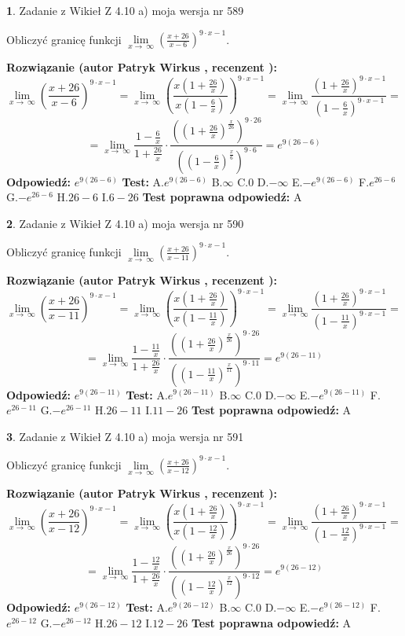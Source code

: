 \documentclass[12pt, a4paper]{article}
\theoremstyle{definition} %
\newtheorem{zad}{}
\newcommand{\zadStart}[1]{\begin{zad}#1\newline}
\newcommand{\zadStop}{\end{zad}}
\newcommand{\rozwStart}[2]{\noindent \textbf{Rozwiązanie (autor #1 , recenzent #2): }\newline}
\newcommand{\rozwStop}{\newline}
\newcommand{\odpStart}{\noindent \textbf{Odpowiedź:}\newline}
\newcommand{\odpStop}{\newline}
\newcommand{\testStart}{\noindent \textbf{Test:}\newline}
\newcommand{\testStop}{\newline}
\newcommand{\kluczStart}{\noindent \textbf{Test poprawna odpowiedź:}\newline}
\newcommand{\kluczStop}{\newline}
\begin{document}
\zadStart{Zadanie z Wikieł Z 4.10 a) moja wersja nr 589}


Obliczyć granicę funkcji  $\lim\limits_{x\to\ \infty}(\frac{x+26}{x-6})^{9\cdot x-1}$.
\zadStop
\rozwStart{Patryk Wirkus}{}
$$\lim\limits_{x\to\ \infty}(\frac{x+26}{x-6})^{9\cdot x-1} = \lim\limits_{x\to\ \infty}(\frac{x(1+\frac{26}{x})}{x(1-\frac{6}{x})})^{9\cdot x-1}=\lim\limits_{x\to\ \infty}\frac{(1+\frac{26}{x})^{9\cdot x-1}}{(1-\frac{6}{x})^{9\cdot x-1}}=$$
$$=\lim\limits_{x\to\ \infty}\frac{1-\frac{6}{x}}{1+\frac{26}{x}}\cdot\frac{((1+\frac{26}{x})^{\frac{x}{26}})^{9\cdot26}}{((1-\frac{6}{x})^{\frac{x}{6}})^{9\cdot6}}=e^{9(26-6)}$$
\rozwStop
\odpStart
$e^{9(26-6)}$
\odpStop
\testStart
A.$e^{9(26-6)}$ B.$\infty$ C.$0$ D.$-\infty$ E.$-e^{9(26-6)}$
F.$e^{26-6}$ G.$-e^{26-6}$
H.$26-6$
I.$6-26$
\testStop
\kluczStart
A
\kluczStop



\zadStart{Zadanie z Wikieł Z 4.10 a) moja wersja nr 590}


Obliczyć granicę funkcji  $\lim\limits_{x\to\ \infty}(\frac{x+26}{x-11})^{9\cdot x-1}$.
\zadStop
\rozwStart{Patryk Wirkus}{}
$$\lim\limits_{x\to\ \infty}(\frac{x+26}{x-11})^{9\cdot x-1} = \lim\limits_{x\to\ \infty}(\frac{x(1+\frac{26}{x})}{x(1-\frac{11}{x})})^{9\cdot x-1}=\lim\limits_{x\to\ \infty}\frac{(1+\frac{26}{x})^{9\cdot x-1}}{(1-\frac{11}{x})^{9\cdot x-1}}=$$
$$=\lim\limits_{x\to\ \infty}\frac{1-\frac{11}{x}}{1+\frac{26}{x}}\cdot\frac{((1+\frac{26}{x})^{\frac{x}{26}})^{9\cdot26}}{((1-\frac{11}{x})^{\frac{x}{11}})^{9\cdot11}}=e^{9(26-11)}$$
\rozwStop
\odpStart
$e^{9(26-11)}$
\odpStop
\testStart
A.$e^{9(26-11)}$ B.$\infty$ C.$0$ D.$-\infty$ E.$-e^{9(26-11)}$
F.$e^{26-11}$ G.$-e^{26-11}$
H.$26-11$
I.$11-26$
\testStop
\kluczStart
A
\kluczStop



\zadStart{Zadanie z Wikieł Z 4.10 a) moja wersja nr 591}


Obliczyć granicę funkcji  $\lim\limits_{x\to\ \infty}(\frac{x+26}{x-12})^{9\cdot x-1}$.
\zadStop
\rozwStart{Patryk Wirkus}{}
$$\lim\limits_{x\to\ \infty}(\frac{x+26}{x-12})^{9\cdot x-1} = \lim\limits_{x\to\ \infty}(\frac{x(1+\frac{26}{x})}{x(1-\frac{12}{x})})^{9\cdot x-1}=\lim\limits_{x\to\ \infty}\frac{(1+\frac{26}{x})^{9\cdot x-1}}{(1-\frac{12}{x})^{9\cdot x-1}}=$$
$$=\lim\limits_{x\to\ \infty}\frac{1-\frac{12}{x}}{1+\frac{26}{x}}\cdot\frac{((1+\frac{26}{x})^{\frac{x}{26}})^{9\cdot26}}{((1-\frac{12}{x})^{\frac{x}{12}})^{9\cdot12}}=e^{9(26-12)}$$
\rozwStop
\odpStart
$e^{9(26-12)}$
\odpStop
\testStart
A.$e^{9(26-12)}$ B.$\infty$ C.$0$ D.$-\infty$ E.$-e^{9(26-12)}$
F.$e^{26-12}$ G.$-e^{26-12}$
H.$26-12$
I.$12-26$
\testStop
\kluczStart
A
\kluczStop
\end{document}
